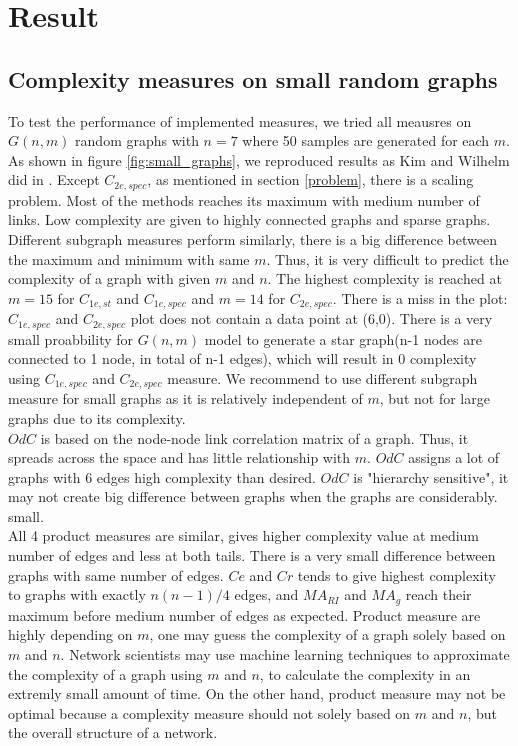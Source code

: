\documentclass[12pt]{article}
\begin{document}
\section{Result}
\subsection{Complexity measures on small random graphs}
To test the performance of implemented measures, we tried all meausres on $G(n,m)$ random graphs with $n=7$ where 50 samples are generated for each $m$. As shown in figure \ref{fig:small_graphs}, we reproduced results as Kim and Wilhelm did in \cite{KIM20082637}. Except $C_{2e,spec}$, as mentioned in section \ref{problem}, there is a scaling problem. Most of the methods reaches its maximum with medium number of links. Low complexity are given to highly connected graphs and sparse graphs.
\\
Different subgraph measures perform similarly, there is a big difference between the maximum and minimum with same $m$. Thus, it is very difficult to predict the complexity of a graph with given $m$ and $n$. The highest complexity is reached at $m=15$ for $C_{1e,st}$ and $C_{1e,spec}$ and $m=14$ for $C_{2e,spec}$. There is a miss in the plot: $C_{1e,spec}$ and $C_{2e,spec}$ plot does not contain a data point at (6,0). There is a very small proabbility for $G(n,m)$ model to generate a star graph(n-1 nodes are connected to 1 node, in total of n-1 edges), which will result in 0 complexity using $C_{1e,spec}$ and $C_{2e,spec}$ measure. We recommend to use different subgraph measure for small graphs as it is relatively independent of $m$, but not for large graphs due to its complexity.\\
$OdC$ is based on the node-node link correlation matrix of a graph.\cite{odc} Thus, it spreads across the space and has little relationship with $m$. $OdC$ assigns a lot of graphs with 6 edges high complexity than desired. $OdC$ is "hierarchy sensitive", it may not create big difference between graphs when the graphs are considerably. small.\\
All 4 product measures are similar, gives higher complexity value at medium number of edges and less at both tails. There is a very small difference between graphs with same number of edges. $Ce$ and $Cr$ tends to give highest complexity to graphs with exactly $n(n-1)/4$ edges, and $MA_{RI}$ and $MA_{g}$ reach their maximum before medium number of edges as expected. Product measure are highly depending on $m$, one may guess the complexity of a graph solely based on $m$ and $n$. Network scientists may use machine learning techniques to approximate the complexity of a graph using $m$ and $n$, to calculate the complexity in an extremly small amount of time. On the other hand, product measure may not be optimal because a complexity measure should not solely based on $m$ and $n$, but the overall structure of a network.
\end{document}
